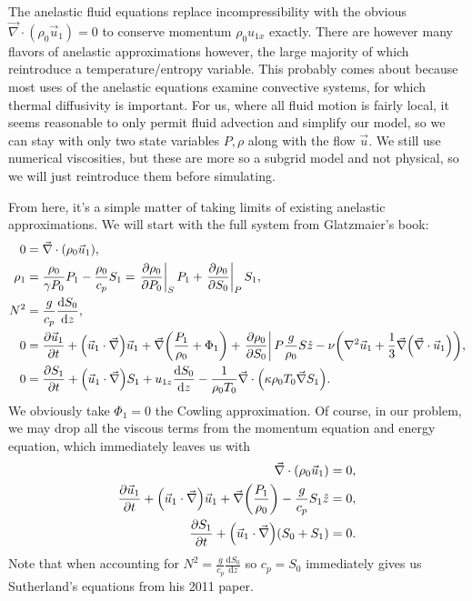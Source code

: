 \documentclass[11pt,
        usenames, %
        dvipsnames %
    ]{report}
\newcommand*{\rd}[2]{\frac{\mathrm{d}#1}{\mathrm{d}#2}}
\newcommand*{\pd}[2]{\frac{\partial#1}{\partial#2}}
\newcommand*{\at}[1]{\left.#1\right|}
\DeclarePairedDelimiter\p{\lparen}{\rparen}
\begin{document}
The anelastic fluid equations replace incompressibility with the obvious
$\vec{\nabla} \cdot (\rho_0\vec{u}_1) = 0$ to conserve momentum $\rho_0 u_{1x}$
exactly. There are however many flavors of anelastic approximations however, the
large majority of which reintroduce a temperature/entropy variable. This
probably comes about because most uses of the anelastic equations examine
convective systems, for which thermal diffusivity is important. For us, where
all fluid motion is fairly local, it seems reasonable to only permit fluid
advection and simplify our model, so we can stay with only two state variables
$P, \rho$ along with the flow $\vec{u}$. We still use numerical viscosities, but
these are more so a subgrid model and not physical, so we will just reintroduce
them before simulating.

From here, it's a simple matter of taking limits of existing anelastic
approximations. We will start with the full system from Glatzmaier's book:
\begin{align}
    0 &= \vec{\nabla} \cdot \p*{\rho_0 \vec{u}_1},\\
    \rho_1 &= \frac{\rho_0}{\gamma P_0}P_1 - \frac{\rho_0}{c_p}S_1
        = \at{\pd{\rho_0}{P_0}}_S P_1 + \at{\pd{\rho_0}{S_0}}_P S_1,\\
    N^2 &= \frac{g}{c_p}\rd{S_0}{z},\\
    0 &= \pd{\vec{u}_1}{t} + \p*{\vec{u}_1 \cdot \vec{\nabla}}\vec{u}_1
        + \vec{\nabla}\p*{\frac{P_1}{\rho_0} + \Phi_1}
        + \at{\pd{\rho_0}{S_0}}P \frac{g}{\rho_0}S\hat{z}
        - \nu \p*{\nabla^2 \vec{u}_1 + \frac{1}{3}\vec{\nabla}\p*{\vec{\nabla}
            \cdot \vec{u}_1}},\\
    0 &= \pd{S_1}{t} + \p*{\vec{u}_1 \cdot \vec{\nabla}}S_1
        + u_{1z}\rd{S_0}{z}
        - \frac{1}{\rho_0 T_0} \vec{\nabla} \cdot \p*{\kappa \rho_0 T_0
            \vec{\nabla} S_1}.
\end{align}
We obviously take $\Phi_1 = 0$ the Cowling approximation. Of course, in our
problem, we may drop all the viscous terms from the momentum equation and energy
equation, which immediately leaves us with
\begin{align}
    \vec{\nabla} \cdot \p*{\rho_0 \vec{u}_1} &= 0,\\
    \pd{\vec{u}_1}{t} + \p*{\vec{u}_1 \cdot \vec{\nabla}}\vec{u}_1
        + \vec{\nabla} \p*{\frac{P_1}{\rho_0}} - \frac{g}{c_p}S_1 \hat{z}
            &= 0,\\
    \pd{S_1}{t} + \p*{\vec{u}_1 \cdot \vec{\nabla}}(S_0 + S_1)
        &= 0.
\end{align}
Note that when accounting for $N^2 = \frac{g}{c_p}\rd{S_0}{z}$ so $c_p = S_0$
immediately gives us Sutherland's equations from his 2011 paper.
\end{document}
